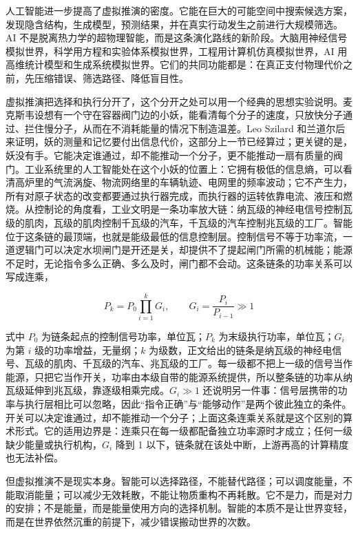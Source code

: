 人工智能进一步提高了虚拟推演的密度。它能在巨大的可能空间中搜索候选方案，发现隐含结构，生成模型，预测结果，并在真实行动发生之前进行大规模筛选。AI 不是脱离热力学的超物理智能，而是这条演化路线的新阶段。大脑用神经信号模拟世界，科学用方程和实验体系模拟世界，工程用计算机仿真模拟世界，AI 用高维统计模型和生成系统模拟世界。它们的共同功能都是：在真正支付物理代价之前，先压缩错误、筛选路径、降低盲目性。

虚拟推演把选择和执行分开了，这个分开之处可以用一个经典的思想实验说明。麦克斯韦设想有一个守在容器阀门边的小妖，能看清每个分子的速度，只放快分子通过、拦住慢分子，从而在不消耗能量的情况下制造温差。Leo Szilard 和兰道尔后来证明，妖的测量和记忆要付出信息代价，这部分上一节已经算过；更关键的是，妖没有手。它能决定谁通过，却不能推动一个分子，更不能推动一扇有质量的阀门。工业系统里的人工智能处在这个小妖的位置上：它拥有极低的信息熵，可以看清高炉里的气流涡旋、物流网络里的车辆轨迹、电网里的频率波动；它不产生力，所有对原子状态的改变都要通过执行器完成，而执行器的运转依靠电流、液压和燃烧。从控制论的角度看，工业文明是一条功率放大链：纳瓦级的神经电信号控制瓦级的肌肉，瓦级的肌肉控制千瓦级的汽车，千瓦级的汽车控制兆瓦级的工厂。智能位于这条链的最顶端，也就是能级最低的信息控制层。控制信号不等于功率流，一道逻辑门可以决定水坝闸门是开还是关，却提供不了提起闸门所需的机械能；能源不足时，无论指令多么正确、多么及时，闸门都不会动。这条链条的功率关系可以写成连乘，

\begin{equation}
P_{k}=P_{0}\prod_{i=1}^{k}G_{i},
\qquad
G_{i}=\frac{P_{i}}{P_{i-1}}\gg 1
\end{equation}

式中 $P_{0}$ 为链条起点的控制信号功率，单位瓦；$P_{k}$ 为末级执行功率，单位瓦；$G_{i}$ 为第 $i$ 级的功率增益，无量纲；$k$ 为级数，正文给出的链条是纳瓦级的神经电信号、瓦级的肌肉、千瓦级的汽车、兆瓦级的工厂。每一级都不把上一级的信号当作能源，只把它当作开关，功率由本级自带的能源系统提供，所以整条链的功率从纳瓦级延伸到兆瓦级，靠逐级相乘完成。$G_{i}\gg1$ 还说明另一件事：信号层携带的功率与执行层相比可以忽略，因此“指令正确”与“能够动作”是两个彼此独立的条件。开关可以决定谁通过，却不能推动一个分子；上面这条连乘关系就是这个区别的算术形式。它的适用边界是：连乘只在每一级都配备独立功率源时才成立；任何一级缺少能量或执行机构，$G_{i}$ 降到 1 以下，链条就在该处中断，上游再高的计算精度也无法补偿。


但虚拟推演不是现实本身。智能可以选择路径，不能替代路径；可以调度能量，不能取消能量；可以减少无效耗散，不能让物质重构不再耗散。它不是力，而是对力的安排；不是能量，而是能量使用方向的选择机制。智能的本质不是让世界变轻，而是在世界依然沉重的前提下，减少错误搬动世界的次数。

